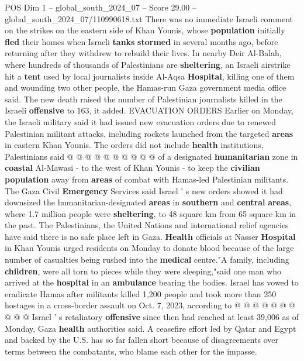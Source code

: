 \begin{textsample}{POS Dim 1 – global\_south\_2024\_07 – Score 29.00 – global\_south\_2024\_07/110990618.txt}
There was no immediate Israeli comment on the strikes on the eastern side of Khan Younis, whose \textbf{population} initially \textbf{fled} their homes when Israeli \textbf{tanks} \textbf{stormed} in several months ago, before returning after they withdrew to rebuild their lives.
In nearby Deir Al-Balah, where hundreds of thousands of Palestinians are \textbf{sheltering}, an Israeli airstrike hit a \textbf{tent} used by local journalists inside Al-Aqsa \textbf{Hospital}, killing one of them and wounding two other people, the Hamas-run Gaza government media office said.
The new death raised the number of Palestinian journalists killed in the Israeli \textbf{offensive} to 163, it added.
EVACUATION ORDERS Earlier on Monday, the Israeli military said it had issued new evacuation orders due to renewed Palestinian militant attacks, including rockets launched from the targeted \textbf{areas} in eastern Khan Younis.
The orders did not include \textbf{health} institutions, Palestinians said @ @ @ @ @ @ @ @ @ @ of a designated \textbf{humanitarian} zone in \textbf{coastal} Al-Mawasi - to the west of Khan Younis - to keep the \textbf{civilian} \textbf{population} away from \textbf{areas} of combat with Hamas-led Palestinian militants.
The Gaza Civil \textbf{Emergency} Services said Israel ' s new orders showed it had downsized the humanitarian-designated \textbf{areas} in \textbf{southern} and \textbf{central} \textbf{areas}, where 1.7 million people were \textbf{sheltering}, to 48 square km from 65 square km in the past.
The Palestinians, the United Nations and international relief agencies have said there is no safe place left in Gaza. \textbf{Health} officials at Nasser \textbf{Hospital} in Khan Younis urged residents on Monday to donate blood because of the large number of casualties being rushed into the \textbf{medical} centre."A family, including \textbf{children}, were all torn to pieces while they were sleeping,"said one man who arrived at the \textbf{hospital} in an \textbf{ambulance} bearing the bodies.
Israel has vowed to eradicate Hamas after militants killed 1,200 people and took more than 250 hostages in a cross-border assault on Oct. 7, 2023, according to @ @ @ @ @ @ @ @ @ @ Israel ' s retaliatory \textbf{offensive} since then had reached at least 39,006 as of Monday, Gaza \textbf{health} authorities said.
A ceasefire effort led by Qatar and Egypt and backed by the U.S. has so far fallen short because of disagreements over terms between the combatants, who blame each other for the impasse.

\end{textsample}
